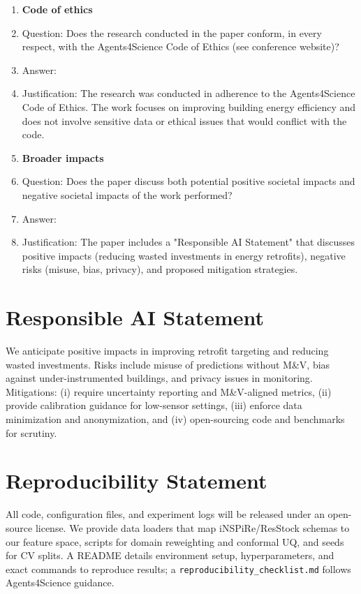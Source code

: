 ﻿\documentclass{article}
\begin{document}
\begin{enumerate}
\item {\bf Code of ethics}
    \item[] Question: Does the research conducted in the paper conform, in every respect, with the Agents4Science Code of Ethics (see conference website)?
    \item[] Answer: \answerYes{}
    \item[] Justification: The research was conducted in adherence to the Agents4Science Code of Ethics. The work focuses on improving building energy efficiency and does not involve sensitive data or ethical issues that would conflict with the code.

\item {\bf Broader impacts}
    \item[] Question: Does the paper discuss both potential positive societal impacts and negative societal impacts of the work performed?
    \item[] Answer: \answerYes{}
    \item[] Justification: The paper includes a "Responsible AI Statement" that discusses positive impacts (reducing wasted investments in energy retrofits), negative risks (misuse, bias, privacy), and proposed mitigation strategies.


\end{enumerate}

\section*{Responsible AI Statement}
We anticipate positive impacts in improving retrofit targeting and reducing wasted investments.
Risks include misuse of predictions without M\&V, bias against under-instrumented buildings, and privacy issues in monitoring.
Mitigations: (i) require uncertainty reporting and M\&V-aligned metrics, (ii) provide calibration guidance for low-sensor settings, (iii) enforce data minimization and anonymization, and (iv) open-sourcing code and benchmarks for scrutiny.

\section*{Reproducibility Statement}
All code, configuration files, and experiment logs will be released under an open-source license.
We provide data loaders that map iNSPiRe/ResStock schemas to our feature space, scripts for domain reweighting and conformal UQ, and seeds for CV splits.
A README details environment setup, hyperparameters, and exact commands to reproduce results; a \texttt{reproducibility\_checklist.md} follows Agents4Science guidance.
\end{document}
